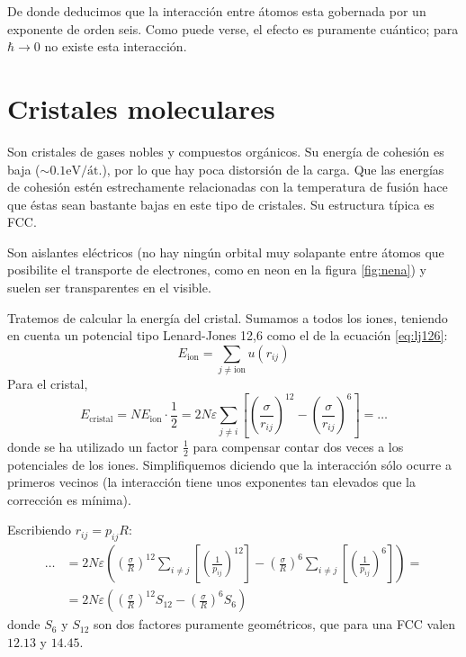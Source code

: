 De donde deducimos que la interacción entre átomos esta gobernada por
un exponente de orden seis. Como puede verse, el efecto es puramente cuántico; para
$\hbar \rightarrow 0$ no existe esta interacción.
 
\section{Cristales moleculares}
Son cristales de gases nobles y compuestos orgánicos. Su energía de
cohesión es baja ($\sim 0.1 \text{eV/át.}$), por lo que hay poca
distorsión de la carga. Que las energías de cohesión estén
estrechamente relacionadas con la temperatura de fusión hace que éstas
sean bastante bajas en este tipo de cristales. Su estructura típica es
FCC.

Son aislantes eléctricos (no hay ningún orbital muy solapante entre
átomos que posibilite el transporte de electrones, como en neon en la
figura \ref{fig:nena}) y suelen ser transparentes en el visible.

Tratemos de calcular la energía del cristal. Sumamos a todos los
iones, teniendo en cuenta un potencial tipo Lenard-Jones 12,6 como el
de la ecuación \ref{eq:lj126}:
\begin{equation}
  E_{\text{ion}} = \sum_{j\neq \text{ion}} u(r_{ij})
\end{equation}
Para el cristal, 
\begin{equation}
  E_{\text{cristal}} = N E_{\text{ion}} \cdot \frac{1}{2} =
                       2N\varepsilon \sum_{j \neq i}
                       \left[\left(\frac{\sigma}{r_{ij}}\right)^{12} -
                       \left( \frac{\sigma}{r_{ij}}\right)^6\right] = \dots
\end{equation}
donde se ha utilizado un factor $\frac{1}{2}$ para compensar contar
dos veces a los potenciales de los iones. Simplifiquemos diciendo que
la interacción sólo ocurre a primeros vecinos (la interacción tiene
unos exponentes tan elevados que la corrección es mínima).

Escribiendo $r_{ij} = p_{ij} R$:
\begin{equation}
\begin{split}
  \dots &= 2N\varepsilon \left( \left( \frac{\sigma}{R} \right)^{12}
    \sum_{i\neq j} \left[  \left( \frac{1}{p_{ij}} \right)^{12}
    \right]   - \left( \frac{\sigma}{R} \right)^{6}
    \sum_{i\neq j} \left[  \left( \frac{1}{p_{ij}} \right)^{6}
    \right]\right) =\\ &= 2N\varepsilon \left( \left( \frac{\sigma}{R} \right)^{12}
    S_{12}   - \left( \frac{\sigma}{R} \right)^{6}
S_6  \right)
\end{split}
\end{equation}
donde $S_6$ y $S_{12}$ son dos factores puramente geométricos, que para una
FCC valen $12.13$ y $14.45$.

